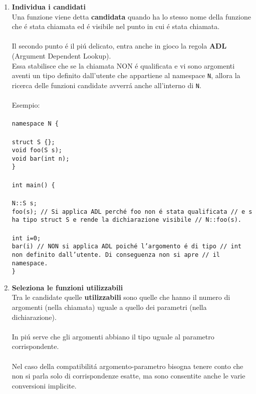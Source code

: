\documentclass{article}
\newcommand\tab[1][1cm]{\hspace*{#1}}
\begin{document}
\begin{enumerate}
\item \textbf{Individua i candidati}\\Una funzione viene detta \textbf{candidata} quando ha lo stesso nome della funzione che \'e stata chiamata ed \'e visibile nel punto in cui \'e stata chiamata. \\ \\ Il secondo punto \'e il pi\'u delicato, entra anche in gioco la regola \textbf{ADL} (Argument Dependent Lookup).\\ Essa stabilisce che se la chiamata NON \'e qualificata e vi sono argomenti aventi un tipo definito dall'utente che appartiene al namespace \texttt{N}, allora la ricerca delle funzioni candidate avverr\'a anche all'interno di \texttt{N}.\\ \\ Esempio: \\ \\ 
\texttt{namespace N \{ \\ \\ \tab struct S \{\}; \\ \tab void foo(S s); \\ \tab void bar(int n); \\ \} \\ \\ int main() \{ \\ \\ \tab N::S s; \\ \tab foo(s); \textcolor{grigio}{// Si applica ADL perch\'e foo non \'e stata qualificata \tab// e s ha tipo struct S e rende la dichiarazione visibile \tab // N::foo(s). }\\ \\ \tab int i=0; \\ \tab bar(i) \textcolor{grigio}{// NON si applica ADL poich\'e l'argomento \'e di tipo \tab // int non definito dall'utente. Di conseguenza non si apre \tab // il namespace. }\\ \}} \\
\item \textbf{Seleziona le funzioni utilizzabili}\\ Tra le candidate quelle \textbf{utilizzabili} sono quelle che hanno il numero di argomenti (nella chiamata) uguale a quello dei parametri (nella dichiarazione). \\ \\ In pi\'u serve che gli argomenti abbiano il tipo uguale al parametro corrispondente. \\ \\Nel caso della compatibilit\'a argomento-parametro bisogna tenere conto che non si parla solo di corrispondenze esatte, ma sono consentite anche le varie conversioni implicite.\\

\end{enumerate}
\end{document}
